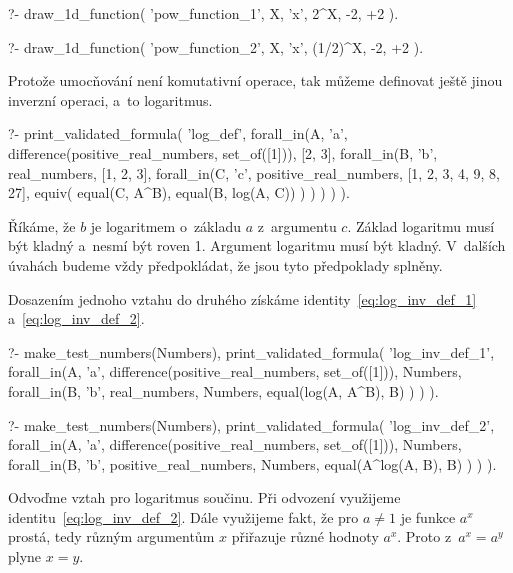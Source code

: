 \begin{prolog}
?-	draw_1d_function(
		'pow_function_1',
		X,
		'x',
		2^X,
		-2, +2
	).				
\end{prolog}

\begin{prolog}
?-	draw_1d_function(
		'pow_function_2',
		X,
		'x',
		(1/2)^X,
		-2, +2
	).				
\end{prolog}

Protože umocňování není komutativní operace, tak můžeme definovat ještě jinou inverzní operaci, a~to logaritmus.

\begin{prolog}
?-	print_validated_formula(
		'log_def',
		forall_in(A, 'a', difference(positive_real_numbers, set_of([1])), [2, 3],
			forall_in(B, 'b', real_numbers, [1, 2, 3],
				forall_in(C, 'c', positive_real_numbers, [1, 2, 3, 4, 9, 8, 27],
					equiv(
						equal(C, A^B),
						equal(B, log(A, C))
					)
				)
			)
		)
	).				
\end{prolog}

Říkáme, že \(b\) je logaritmem o~základu \(a\) z~argumentu \(c\). Základ logaritmu musí být kladný a~nesmí být roven 1. Argument logaritmu musí být kladný. V~dalších úvahách budeme vždy předpokládat, že jsou tyto předpoklady splněny.

Dosazením jednoho vztahu do druhého získáme identity~\eqref{eq:log_inv_def_1} a~\eqref{eq:log_inv_def_2}.

\begin{fact}
\begin{prolog}
?-	make_test_numbers(Numbers),
	print_validated_formula(
		'log_inv_def_1',
		forall_in(A, 'a', difference(positive_real_numbers, set_of([1])), Numbers,
			forall_in(B, 'b', real_numbers, Numbers,
				equal(log(A, A^B), B)
			)
		)
	).				
\end{prolog}
\begin{prolog}
?-	make_test_numbers(Numbers),
	print_validated_formula(
		'log_inv_def_2',
		forall_in(A, 'a', difference(positive_real_numbers, set_of([1])), Numbers,
			forall_in(B, 'b', positive_real_numbers, Numbers,
				equal(A^log(A, B), B)
			)
		)
	).				
\end{prolog}
\end{fact}

Odvoďme vztah pro logaritmus součinu. Při odvození využijeme identitu~\eqref{eq:log_inv_def_2}. Dále využijeme fakt, že pro \(a \neq 1\) je funkce \(a^x\) prostá, tedy různým argumentům \(x\) přiřazuje různé hodnoty \(a^x\). Proto z~\(a^x = a^y\) plyne \(x = y\).

